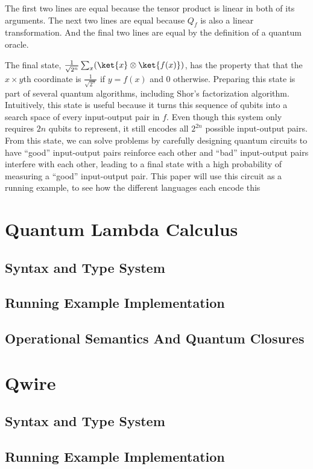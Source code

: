 \documentclass[acmsmall,screen,review]{acmart}
\begin{document}
The first two lines are equal because the tensor product is linear in both of its arguments. The next two lines are equal because $Q_f$ is also a linear transformation. And the final two lines are equal by the definition of a quantum oracle.

The final state, $\frac{1}{\sqrt{2^n}}\sum_x (\ket{x} \otimes\ket{f(x)})$, has the property that that the $x \times y$th coordinate is $\frac{1}{\sqrt{2^n}}$ if $y = f(x)$ and $0$ otherwise. Preparing this state is part of several quantum algorithms, including Shor’s factorization algorithm. Intuitively, this state is useful because it turns this sequence of qubits into a search space of every input-output pair in $f$. Even though this system only requires $2n$ qubits to represent, it still encodes all $2^{2n}$ possible input-output pairs. From this state, we can solve problems by carefully designing quantum circuits to have “good” input-output pairs reinforce each other and “bad” input-output pairs interfere with each other, leading to a final state with a high probability of measuring a “good” input-output pair. This paper will use this circuit as a running example, to see how the different languages each encode this 

\section{Quantum Lambda Calculus}
\subsection{Syntax and Type System}
\subsection{Running Example Implementation}
\subsection{Operational Semantics And Quantum Closures}

\section{Qwire}
\subsection{Syntax and Type System}
\subsection{Running Example Implementation}
\end{document}
